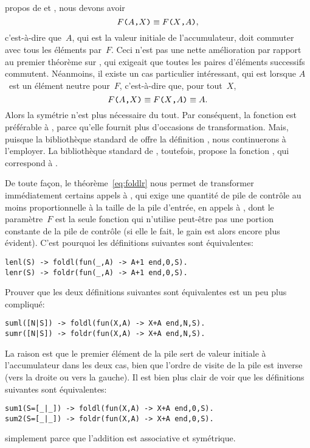 propos de  et , nous devons
avoir
\begin{equation*}
\texttt{\(F\)(\(A\),\(X\))}
\equiv
\texttt{\(F\)(\(X\),\(A\))},
\end{equation*}
c'est-à-dire que~\(A\), qui est la valeur initiale de l'accumulateur,
doit commuter avec tous les éléments par~\(F\). Ceci n'est pas une
nette amélioration par rapport au premier théorème sur
, qui exigeait que toutes les paires d'éléments
successifs commutent. Néanmoins, il existe un cas particulier
intéressant, qui est lorsque \(A\)~est un élément neutre pour~\(F\),
c'est-à-dire que, pour tout~\(X\),
\begin{equation*}
\texttt{\(F\)(\(A\),\(X\))}
\equiv
\texttt{\(F\)(\(X\),\(A\))} \equiv A.
\end{equation*}
Alors la symétrie n'est plus nécessaire du tout. Par conséquent, la
fonction  est préférable à ,
parce qu'elle fournit plus d'occasions de transformation. Mais,
puisque la bibliothèque standard de \Erlang offre la définition
, nous continuerons à l'employer. La bibliothèque
standard de \OCaml, toutefois, propose la fonction
, qui correspond à .

De toute façon, le théorème~\eqref{eq:foldlr} nous permet de
transformer immédiatement certains appels à , qui
exige une quantité de pile de contrôle au moins proportionnelle à la
taille de la pile d'entrée, en appels à , dont le
paramètre~\(F\) est la seule fonction qui n'utilise peut-être pas une
portion constante de la pile de contrôle (si elle le fait, le gain est
alors encore plus évident). C'est pourquoi les définitions suivantes
sont équivalentes:
\begin{verbatim}
lenl(S) -> foldl(fun(_,A) -> A+1 end,0,S).
lenr(S) -> foldr(fun(_,A) -> A+1 end,0,S).
\end{verbatim}
Prouver que les deux définitions suivantes sont équivalentes est un
peu plus compliqué:
\begin{verbatim}
suml([N|S]) -> foldl(fun(X,A) -> X+A end,N,S).
sumr([N|S]) -> foldr(fun(X,A) -> X+A end,N,S).
\end{verbatim}
La raison est que le premier élément de la pile sert de valeur
initiale à l'accumulateur dans les deux cas, bien que l'ordre de
visite de la pile est inverse (vers la droite ou vers la gauche). Il
est bien plus clair de voir que les définitions suivantes sont
équivalentes:
\begin{verbatim}
sum1(S=[_|_]) -> foldl(fun(X,A) -> X+A end,0,S).
sum2(S=[_|_]) -> foldr(fun(X,A) -> X+A end,0,S).
\end{verbatim}
simplement parce que l'addition est associative et symétrique.

